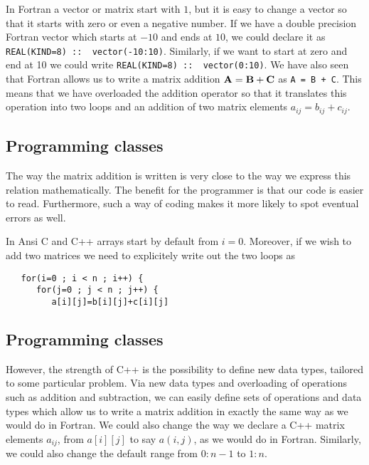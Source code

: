 \documentclass[%
oneside,                 %
final,                   %
10pt]{article}
\begin{document}
In Fortran a vector or matrix start with $1$, but it is easy
to change a vector so that it starts with zero or even a negative number.
If we have a double precision Fortran vector  which starts at $-10$ and ends at $10$, we could declare it as
\Verb!REAL(KIND=8) ::  vector(-10:10)!. Similarly, if we want to start at zero and end at 10 we could write
\Verb!REAL(KIND=8) ::  vector(0:10)!.
We have also seen that Fortran  allows us to write a matrix addition ${\bf A} = {\bf B}+{\bf C}$ as
\Verb!A = B + C!.  This means that we have overloaded the addition operator so that it translates this operation into
two loops and an addition of two matrix elements $a_{ij} = b_{ij}+c_{ij}$.

\subsection*{Programming classes}

The way the matrix addition is written is very close to the way we express this relation mathematically. The benefit for the
programmer is that our code is easier to read. Furthermore, such a way of coding makes it  more likely  to spot eventual
errors as well.

In Ansi C and C++ arrays start by default from $i=0$.  Moreover, if we  wish to add two matrices we need to explicitely write out
the two loops as

\begin{verbatim}
   for(i=0 ; i < n ; i++) {
      for(j=0 ; j < n ; j++) {
         a[i][j]=b[i][j]+c[i][j]

\end{verbatim}

\subsection*{Programming classes}

However,
the strength of C++ is the possibility
to define new data types, tailored to some particular problem.
Via new data types and overloading of operations such as addition and subtraction, we can easily define
sets of operations and data types which allow us to write a matrix addition in exactly the same
way as we would do in Fortran.  We could also change the way we declare a C++ matrix elements $a_{ij}$, from  $a[i][j]$
to say $a(i,j)$, as we would do in Fortran. Similarly, we could also change the default range from $0:n-1$ to $1:n$.
\end{document}
